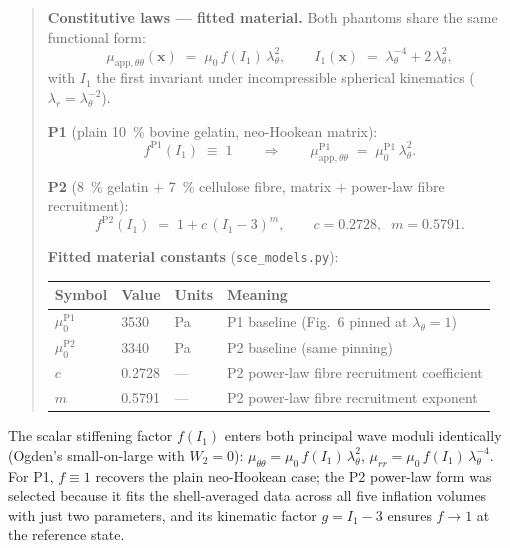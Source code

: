 \documentclass[11pt,letterpaper]{article}
\newenvironment{blueb}{\par\medskip\noindent\begin{quote}\small}{\end{quote}\medskip}
\newcommand{\vect}[1]{\boldsymbol{#1}}
\begin{document}
\begin{blueb}\textbf{Constitutive laws — fitted material.} \newline
Both phantoms share the same functional form:
\begin{equation}
\mu_{\text{app},\theta\theta}(\vect x) \;=\; \mu_0\,f(I_1)\,\lambda_\theta^{2},
\qquad
I_1(\vect x) \;=\; \lambda_\theta^{-4} + 2\,\lambda_\theta^{2},
\label{eq:app-tt}
\end{equation}
with $I_1$ the first invariant under incompressible spherical
kinematics ($\lambda_r = \lambda_\theta^{-2}$).

\textbf{P1} (plain \SI{10}{\percent} bovine gelatin, neo-Hookean matrix):
\begin{equation}
f^{\text{P1}}(I_1) \;\equiv\; 1
\qquad\Rightarrow\qquad
\mu_{\text{app},\theta\theta}^{\text{P1}} \;=\; \mu_0^{\text{P1}}\,\lambda_\theta^{2}.
\label{eq:p1}
\end{equation}

\textbf{P2} (\SI{8}{\percent} gelatin $+$ \SI{7}{\percent} cellulose fibre,
matrix $+$ power-law fibre recruitment):
\begin{equation}
f^{\text{P2}}(I_1) \;=\; 1 + c\,(I_1 - 3)^m,
\qquad c = 0.2728,\;\; m = 0.5791.
\label{eq:p2}
\end{equation}

\bigskip
\textbf{Fitted material constants} (\texttt{sce\_models.py}):

\begin{center}
\begin{tabular}{llll}
\toprule
Symbol & Value & Units & Meaning \\
\midrule
$\mu_0^{\text{P1}}$ & 3530 & \si{\pascal} & P1 baseline (Fig.~6 pinned at $\lambda_\theta=1$) \\
$\mu_0^{\text{P2}}$ & 3340 & \si{\pascal} & P2 baseline (same pinning) \\
$c$ & 0.2728 & --- & P2 power-law fibre recruitment coefficient \\
$m$ & 0.5791 & --- & P2 power-law fibre recruitment exponent \\
\bottomrule
\end{tabular}
\end{center}
\end{blueb}

The scalar stiffening factor $f(I_1)$ enters both principal wave
moduli identically (Ogden's small-on-large with $W_2 = 0$):
$\mu_{\theta\theta} = \mu_0\,f(I_1)\,\lambda_\theta^{2}$,
$\mu_{rr} = \mu_0\,f(I_1)\,\lambda_\theta^{-4}$. For P1, $f\equiv 1$
recovers the plain neo-Hookean case; the P2 power-law form was
selected because it fits the shell-averaged data across all five
inflation volumes with just two parameters, and its kinematic factor
$g = I_1 - 3$ ensures $f\to 1$ at the reference state.
\end{document}
